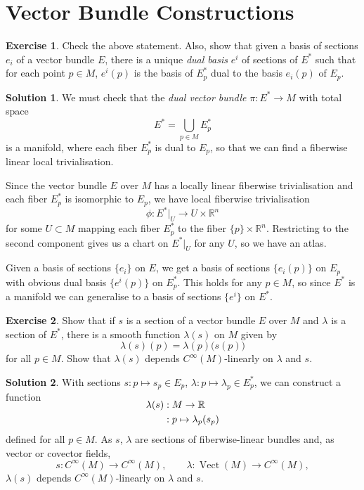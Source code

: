 \documentclass[11pt, a4paper]{report}
\theoremstyle{definition}
\newtheorem{exercise}{Exercise}[part]
\newtheorem{solution}{Solution}[part]
\newenvironment{ex}{\begin{exercise}}{\end{exercise}\pagebreak[1]}
\newenvironment{sol}{\begin{solution}}{\end{solution}\pagebreak[3]}
\DeclareMathOperator{\Vect}{Vect}
\begin{document}
\section{Vector Bundle Constructions}

\begin{ex}

Check the above statement.
Also, show that given a basis of sections $e_i$ of a vector bundle $E$, there is a unique \emph{dual basis} $e^i$ of sections of $E^*$ such that for each point $p \in M$, $e^i(p)$ is the basis of $E^*_p$ dual to the basis $e_i(p)$ of $E_p$.

\end{ex}

\begin{sol}

We must check that the \emph{dual vector bundle} $\pi: E^* \to M$ with total space
\[
    E^* = \bigcup_{p \in M} E^*_p
\]
is a manifold, where each fiber $E^*_p$ is dual to $E_p$, so that we can find a fiberwise linear local trivialisation.

Since the vector bundle $E$ over $M$ has a locally linear fiberwise trivialisation and each fiber $E^*_p$ is isomorphic to $E_p$, we have local fiberwise trivialisation
\[
    \phi: E^*|_U \to U \times \mathbb{R}^n
\]
for some $U \subset M$ mapping each fiber $E^*_p$ to the fiber $\{p\} \times \mathbb{R}^n$. Restricting to the second component gives us a chart on $E^*|_U$ for any $U$, so we have an atlas.

Given a basis of sections $\{e_i\}$ on $E$, we get a basis of sections $\{e_i(p)\}$ on $E_p$ with obvious dual basis $\{e^i(p)\}$ on $E^*_p$.
This holds for any $p \in M$, so since $E^*$ is a manifold we can generalise to a basis of sections $\{e^i\}$ on $E^*$.

\end{sol}

\begin{ex}

Show that if $s$ is a section of a vector bundle $E$ over $M$ and $\lambda$ is a section of $E^*$, there is a smooth function $\lambda(s)$ on $M$ given by
\[
    \lambda(s)(p) = \lambda(p)\bigl(s(p)\bigr)
\]
for all $p \in M$. Show that $\lambda(s)$ depends $C^\infty(M)$-linearly on $\lambda$ and $s$.

\end{ex}

\begin{sol}

With sections $s: p \mapsto s_p \in E_p$, $\lambda: p \mapsto \lambda_p \in E^*_p$, we can construct a function
\begin{align*}
    \SwapAboveDisplaySkip
    \lambda(s) &: M \to \mathbb{R} \\
               &: p \mapsto \lambda_p (s_p)
\end{align*}
defined for all $p \in M$.
As $s$, $\lambda$ are sections of fiberwise-linear bundles and, as vector or covector fields,
\[
    s: C^\infty(M) \to C^\infty(M), \qquad \lambda: \Vect(M) \to C^\infty(M),
\]
$\lambda(s)$ depends $C^\infty(M)$-linearly on $\lambda$ and $s$.

\end{sol}
\end{document}
